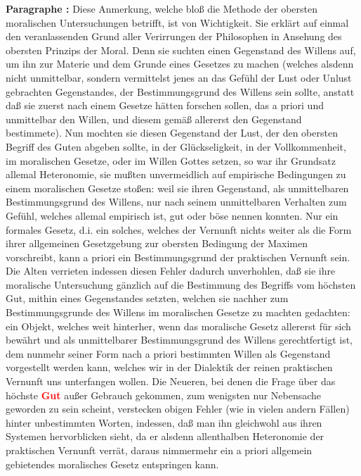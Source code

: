 \documentclass[a4paper,12pt,twoside]{book}
\newcommand{\match}[1]{\textcolor{red}{\textbf{#1}}}
\begin{document}
	\noindent\textbf{Paragraphe : }Diese Anmerkung, welche bloß die Methode der obersten moralischen Untersuchungen betrifft, ist von Wichtigkeit. Sie erklärt auf einmal den veranlassenden Grund aller Verirrungen der Philosophen in Ansehung des obersten Prinzips der Moral. Denn sie suchten einen Gegenstand des Willens auf, um ihn zur Materie und dem Grunde eines Gesetzes zu machen (welches alsdenn nicht unmittelbar, sondern vermittelst jenes an das Gefühl der Lust oder Unlust gebrachten Gegenstandes, der Bestimmungsgrund des Willens sein sollte, anstatt daß sie zuerst nach einem Gesetze hätten forschen sollen, das a priori und unmittelbar den Willen, und diesem gemäß allererst den Gegenstand bestimmete). Nun mochten sie diesen Gegenstand der Lust, der den obersten Begriff des Guten abgeben sollte, in der Glückseligkeit, in der Vollkommenheit, im moralischen Gesetze, oder im Willen Gottes setzen, so war ihr Grundsatz allemal Heteronomie, sie mußten unvermeidlich auf empirische Bedingungen zu einem moralischen Gesetze stoßen: weil sie ihren Gegenstand, als unmittelbaren Bestimmungsgrund des Willens, nur nach seinem unmittelbaren Verhalten zum Gefühl, welches allemal empirisch ist, gut oder böse nennen konnten. Nur ein formales Gesetz, d.i. ein solches, welches der Vernunft nichts weiter als die Form ihrer allgemeinen Gesetzgebung zur obersten Bedingung der Maximen vorschreibt, kann a priori ein Bestimmungsgrund der praktischen Vernunft sein. Die Alten verrieten indessen diesen Fehler dadurch unverhohlen, daß sie ihre moralische Untersuchung gänzlich auf die Bestimmung des Begriffs vom höchsten Gut, mithin eines Gegenstandes setzten, welchen sie nachher zum Bestimmungsgrunde des Willens im moralischen  Gesetze zu machten gedachten: ein Objekt, welches weit hinterher, wenn das moralische Gesetz allererst für sich bewährt und als unmittelbarer Bestimmungsgrund des Willens gerechtfertigt ist, dem nunmehr seiner Form nach a priori bestimmten Willen als Gegenstand vorgestellt werden kann, welches wir in der Dialektik der reinen praktischen Vernunft uns unterfangen wollen. Die Neueren, bei denen die Frage über das höchste \match{Gut} außer Gebrauch gekommen, zum wenigsten nur Nebensache geworden zu sein scheint, verstecken obigen Fehler (wie in vielen andern Fällen) hinter unbestimmten Worten, indessen, daß man ihn gleichwohl aus ihren Systemen hervorblicken sieht, da er alsdenn allenthalben Heteronomie der praktischen Vernunft verrät, daraus nimmermehr ein a priori allgemein gebietendes moralisches Gesetz entspringen kann. 
	
\end{document}
